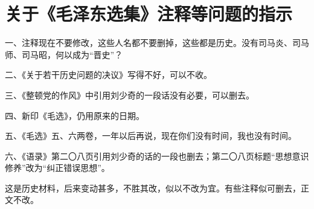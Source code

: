 \section[关于《毛泽东选集》注释等问题的指示（一九六七年三、八月）]{关于《毛泽东选集》注释等问题的指示}


一、注释现在不要修改，这些人名都不要删掉，这些都是历史。没有司马炎、司马师、司马昭，何以成为“晋史”？

二、《关于若干历史问题的决议》写得不好，可以不收。

三、《整顿党的作风》中引用刘少奇的一段话没有必要，可以删去。

四、新印《毛选》，仍用原来的日期。

五、《毛选》五、六两卷，一年以后再说，现在你们没有时间，我也没有时间。

六、《语录》第二〇八页引用刘少奇的话的一段也删去；第二〇八页标题“思想意识修养”改为“纠正错误思想”。



这是历史材料，后来变动甚多，不胜其改，似以不改为宜。有些注释似可删去，正文不改。


